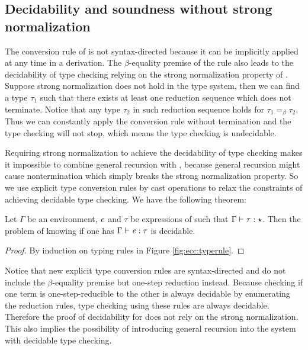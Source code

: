 \subsection{Decidability and soundness without strong normalization}\label{sec:ecc:sound}
The conversion rule of \cc is not syntax-directed because it can be implicitly applied at any time in a derivation. The $\beta$-equality premise of the rule also leads to the decidability of type checking relying on the strong normalization property of \cc. Suppose strong normalization does not hold in the type system, then we can find a type $\tau_{{\mathrm{1}}}$ such that there exists at least one reduction sequence which does not terminate. Notice that any type $\tau_{{\mathrm{2}}}$ in such reduction sequence holds for $\tau_{{\mathrm{1}}}  =_{\beta}  \tau_{{\mathrm{2}}}$. Thus we can constantly apply the conversion rule without termination and the type checking will not stop, which means the type checking is undecidable.

Requiring strong normalization to achieve the decidability of type checking makes it impossible to combine general recursion with \cc, because general recursion might cause nontermination which simply breaks the strong normalization property. So we use explicit type conversion rules by cast operations to relax the constraints of achieving decidable type checking. We have the following theorem:

\begin{thm}
Let $\Gamma$ be an environment, $\mathit{e}$ and $\tau$ be expressions of \expcc such that $\Gamma  \vdash  \tau  :  \star$. Then the problem of knowing if one has $\Gamma  \vdash  \mathit{e}  :  \tau$ is decidable.
\end{thm}

\begin{proof}
By induction on typing rules in Figure \ref{fig:ecc:typerule}.
\end{proof}

Notice that new explicit type conversion rules are syntax-directed and do not include the $\beta$-equality premise but one-step reduction instead. Because checking if one term is one-step-reducible to the other is always decidable by enumerating the reduction rules, type checking using these rules are always decidable. Therefore the proof of decidability for \expcc does not rely on the strong normalization. This also implies the possibility of introducing general recursion into the system with decidable type checking.

